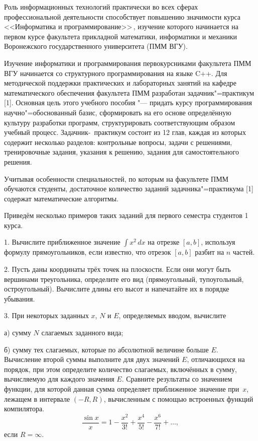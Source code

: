 \vzmscaption

Роль информационных технологий практически во всех сферах профессиональной деятельности способствует повышению значимости
курса <<Информатика и программирование>>\,, изучение которого начинается на первом курсе факультета прикладной математики,
информатики и механики Воронежского государственного университета \linebreak (ПММ ВГУ).

Изучение информатики и программирования первокурсниками факультета ПММ ВГУ начинается со структурного программирования
на языке C++. Для методической поддержки практических и лабораторных занятий на кафедре математического обеспечения
факультета ПММ разработан задачник"=практикум [1]. Основная цель этого учебного пособия "--- придать курсу программирования
научно"=обоснованный базис, сформировать на его основе определённую культуру разработки программ, структурировать
соответствующим образом учебный процесс. Задачник-~практикум состоит из 12 глав, каждая из которых содержит несколько
разделов: контрольные вопросы, задачи с решениями, тренировочные задания, указания к решению, задания для самостоятельного
решения.

Учитывая особенности специальностей, по которым на факультете ПММ обучаются студенты, достаточное количество заданий
задачника"=практикума [1] содержат математические алгоритмы.

Приведём несколько примеров таких заданий для первого семестра студентов 1 курса.

1. Вычислите приближенное значение $\int x^2\,dx$ на отрезке $[a, b]$, используя формулу прямоугольников, если
известно, что отрезок $[a, b]$ разбит на $n$ частей.

2. Пусть даны координаты трёх точек на плоскости. Если они могут быть вершинами треугольника, определите его
вид (прямоугольный, тупоугольный, остроугольный). Вычислите длины его высот и напечатайте их в порядке убывания.

3. При некоторых заданных $x$, $N$ и $E$, определяемых вводом, вычислите

а) сумму $N$ слагаемых заданного вида;

б) сумму тех слагаемых, которые по абсолютной величине больше $E$. Вычисление второй суммы выполните для двух значений $E$,
отличающихся на порядок, при этом определите количество слагаемых, включённых в сумму, вычисляемую для каждого значения
$E$.
Сравните результаты со значением функции, для которой данная сумма определяет приближенное значение при \,$x$, лежащем в интервале
\linebreak
$(-R, R)$, вычисленным с помощью встроенных функций
ко\-мпилятора.
$$
\frac{\sin x}{x}=1-\frac{x^2}{3!}+\frac{x^4}{5!}-\frac{x^6}{7!}+\dots,
$$
если $R=\infty$.

